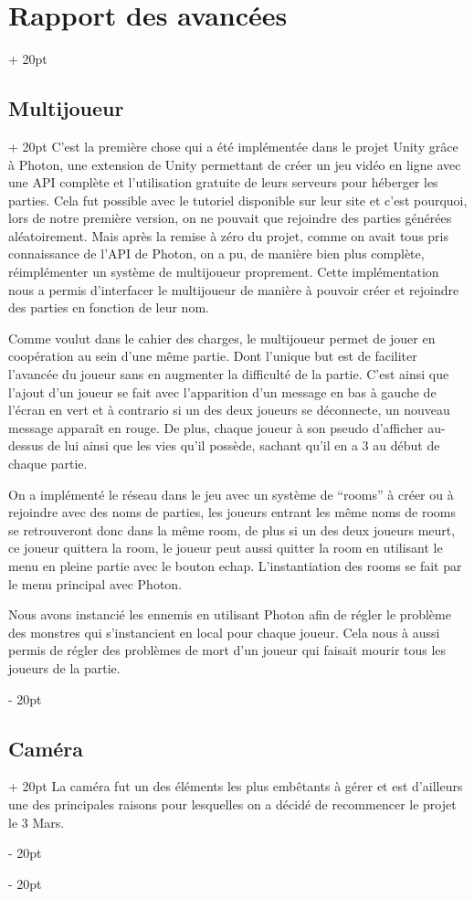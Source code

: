 \documentclass[a4paper, 12pt, twoside]{article}
\newcommand{\ind}[1][20pt]{\advance\leftskip + #1}
\newcommand{\deind}[1][20pt]{\advance\leftskip - #1}
\newenvironment{indt}[2][20pt]{#2 \par \ind[#1]}{\par \deind} %
\begin{document}
\begin{indt}{\section{Rapport des avancées}}
        \begin{indt}{\subsection{Multijoueur}}
            C'est la première chose qui a été implémentée dans le projet Unity grâce à Photon, une extension de Unity permettant de créer un jeu vidéo en ligne avec une API complète et l'utilisation gratuite de leurs serveurs pour héberger les parties. Cela fut possible avec le tutoriel disponible sur leur site et c'est pourquoi, lors de notre première version, on ne pouvait que rejoindre des parties générées aléatoirement. Mais après la remise à zéro du projet, comme on avait tous pris connaissance de l'API de Photon, on a pu, de manière bien plus complète, réimplémenter un système de multijoueur proprement. Cette implémentation nous a permis d'interfacer le multijoueur de manière à pouvoir créer et rejoindre des parties en fonction de leur nom.

            Comme voulut dans le cahier des charges, le multijoueur permet de jouer en coopération au sein d'une même partie. Dont l'unique but est de faciliter l'avancée du joueur sans en augmenter la difficulté de la partie. C'est ainsi que l'ajout d'un joueur se fait avec l'apparition d'un message en bas à gauche de l'écran en vert et à contrario si un des deux joueurs se déconnecte, un nouveau message apparaît en rouge. De plus, chaque joueur à son pseudo d'afficher au-dessus de lui ainsi que les vies qu'il possède, sachant qu'il en a 3 au début de chaque partie.

            On a implémenté le réseau dans le jeu avec un système de “rooms” à créer ou à rejoindre avec des noms de parties, les joueurs entrant les même noms de rooms se retrouveront donc dans la même room, de plus si un des deux joueurs meurt, ce joueur quittera la room, le joueur peut aussi quitter la room en utilisant le menu en pleine partie avec le bouton echap. L'instantiation des rooms se fait par le menu principal avec Photon. 
        
            Nous avons instancié les ennemis en utilisant Photon afin de régler  le problème des monstres qui s'instancient en local pour chaque joueur. Cela nous à aussi permis de régler des problèmes de mort d'un joueur qui faisait mourir tous les joueurs de la partie.
        \end{indt}

        \begin{indt}{\subsection{Caméra}}
            La caméra fut un des éléments les plus embêtants à gérer et est d'ailleurs une des principales raisons pour lesquelles on a décidé de recommencer le projet le 3 Mars. 


\end{indt}
\end{indt}
\end{document}
